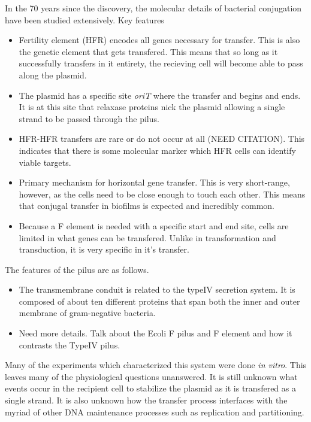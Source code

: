In the 70 years since the discovery, the molecular details of bacterial
conjugation have been studied extensively. Key features
\begin{itemize}
	\item Fertility element (HFR) encodes all genes necessary for transfer.
		This is also the genetic element that gets transfered. This
		means that so long as it successfully transfers in it entirety,
		the recieving cell will become able to pass along the plasmid. 
	\item The plasmid has a specific site \textit{oriT} where the transfer
		and begins and ends. It is at this site that relaxase proteins
		nick the plasmid allowing a single strand to be passed through
		the pilus.
	\item HFR-HFR transfers are rare or do not occur at all (NEED CITATION).
		This indicates that there is some molecular marker which HFR
		cells can identify viable targets.
	\item Primary mechanism for horizontal gene transfer. This is very
		short-range, however, as the cells need to be close enough to
		touch each other. This means that conjugal transfer in biofilms
		is expected and incredibly common. 
	\item Because a F element is needed with a specific start and end site,
		cells are limited in what genes can be transfered. Unlike in
		transformation and transduction, it is very specific in it's transfer. 
	
\end{itemize}

The features of the pilus are as follows.
\begin{itemize}
	\item The transmembrane conduit is related to the typeIV secretion
		system. It is composed of about ten different proteins that span
		both the inner and outer membrane of gram-negative bacteria.
	\item Need more details. Talk about the Ecoli F pilus and F element and
		how it contrasts the TypeIV pilus.
\end{itemize}


Many of the experiments which characterized this system were done \textit{in
vitro}. This leaves many of the physiological questions unanswered. It is still
unknown what events occur in the recipient cell to stabilize the plasmid as it
is transfered as a single strand. It is also unknown how the transfer process
interfaces with the myriad of other DNA maintenance processes such as
replication and partitioning. 

